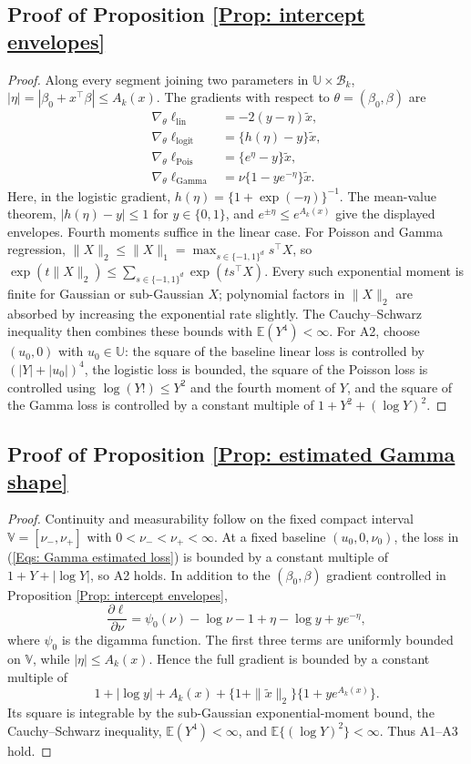 \documentclass[12pt]{article}
\newenvironment{bluechange}{\begingroup\color[rgb]{0.00,0.00,1.00}}{\endgroup}
\theoremstyle{remark}
\theoremstyle{plain}
\begin{document}
\begin{bluechange}
\subsection{Proof of Proposition \ref{Prop: intercept envelopes}}
\begin{proof}
Along every segment joining two parameters in $\mathbb{U}\times\mathcal B_k$,
$|\eta|=|\beta_0+x^\top\beta|\le A_k(x)$. The gradients with respect to $\theta=(\beta_0,\beta)$ are
\begin{align*}
\nabla_\theta\ell_{\mathrm{lin}}&=-2(y-\eta)\widetilde x,\\
\nabla_\theta\ell_{\mathrm{logit}}&=\{h(\eta)-y\}\widetilde x,\\
\nabla_\theta\ell_{\mathrm{Pois}}&=\{e^\eta-y\}\widetilde x,\\
\nabla_\theta\ell_{\mathrm{Gamma}}&=\nu\{1-ye^{-\eta}\}\widetilde x.
\end{align*}
Here, in the logistic gradient, $h(\eta)=\{1+\exp(-\eta)\}^{-1}$.
The mean-value theorem, $|h(\eta)-y|\le1$ for $y\in\{0,1\}$, and $e^{\pm\eta}\le e^{A_k(x)}$ give the displayed envelopes. Fourth moments suffice in the linear case. For Poisson and Gamma regression, $\|X\|_2\leq\|X\|_1=\max_{s\in\{-1,1\}^d}s^\top X$, so $\exp(t\|X\|_2)\leq\sum_{s\in\{-1,1\}^d}\exp(ts^\top X)$. Every such exponential moment is finite for Gaussian or sub-Gaussian $X$; polynomial factors in $\|X\|_2$ are absorbed by increasing the exponential rate slightly. The Cauchy--Schwarz inequality then combines these bounds with $\mathbb E(Y^4)<\infty$. For A2, choose $(u_0,0)$ with $u_0\in\mathbb{U}$: the square of the baseline linear loss is controlled by $(|Y|+|u_0|)^4$, the logistic loss is bounded, the square of the Poisson loss is controlled using $\log(Y!)\le Y^2$ and the fourth moment of $Y$, and the square of the Gamma loss is controlled by a constant multiple of $1+Y^2+(\log Y)^2$.
\end{proof}

\subsection{Proof of Proposition \ref{Prop: estimated Gamma shape}}
\begin{proof}
Continuity and measurability follow on the fixed compact interval $\mathbb V=[\nu_-,\nu_+]$ with $0<\nu_-<\nu_+<\infty$. At a fixed baseline $(u_0,0,\nu_0)$, the loss in (\ref{Eqs: Gamma estimated loss}) is bounded by a constant multiple of $1+Y+|\log Y|$, so A2 holds. In addition to the $(\beta_0,\beta)$ gradient controlled in Proposition \ref{Prop: intercept envelopes},
\[
\frac{\partial\ell}{\partial\nu}
=\psi_0(\nu)-\log\nu-1+\eta-\log y+ye^{-\eta},
\]
where $\psi_0$ is the digamma function. The first three terms are uniformly bounded on $\mathbb{V}$, while $|\eta|\le A_k(x)$. Hence the full gradient is bounded by a constant multiple of
\[
1+|\log y|+A_k(x)+\{1+\|\widetilde x\|_2\}\{1+ye^{A_k(x)}\}.
\]
Its square is integrable by the sub-Gaussian exponential-moment bound, the Cauchy--Schwarz inequality, $\mathbb E(Y^4)<\infty$, and $\mathbb E\{(\log Y)^2\}<\infty$. Thus A1--A3 hold.
\end{proof}


\end{bluechange}
\end{document}
